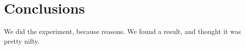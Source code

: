 \section{Conclusions}
We did the experiment, because reasons. We found a result, and thought it
was pretty nifty.
